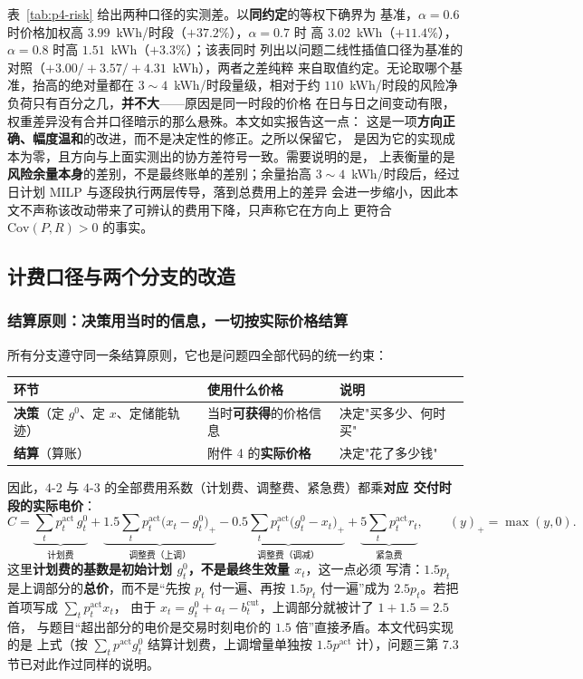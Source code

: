 表~\ref{tab:p4-risk} 给出两种口径的实测差。以\textbf{同约定}的等权下确界为
基准，$\alpha=0.6$ 时价格加权高 $3.99$~kWh/时段（$+37.2\%$），$\alpha=0.7$ 时
高 $3.02$~kWh（$+11.4\%$），$\alpha=0.8$ 时高 $1.51$~kWh（$+3.3\%$）；该表同时
列出以问题二线性插值口径为基准的对照（$+3.00/+3.57/+4.31$~kWh），两者之差纯粹
来自取值约定。无论取哪个基准，抬高的绝对量都在 $3\sim4$~kWh/时段量级，相对于约
$110$~kWh/时段的风险净负荷只有百分之几，\textbf{并不大}——原因是同一时段的价格
在日与日之间变动有限，权重差异没有合并口径暗示的那么悬殊。本文如实报告这一点：
这是一项\textbf{方向正确、幅度温和}的改进，而不是决定性的修正。之所以保留它，
是因为它的实现成本为零，且方向与上面实测出的协方差符号一致。需要说明的是，
上表衡量的是\textbf{风险余量本身}的差别，不是最终账单的差别；余量抬高
$3\sim4$~kWh/时段后，经过日计划 MILP 与逐段执行两层传导，落到总费用上的差异
会进一步缩小，因此本文不声称该改动带来了可辨认的费用下降，只声称它在方向上
更符合 $\mathrm{Cov}(P,R)>0$ 的事实。

\subsection{计费口径与两个分支的改造}
\label{sec:p4-model}

\subsubsection{结算原则：决策用当时的信息，一切按实际价格结算}

所有分支遵守同一条结算原则，它也是问题四全部代码的统一约束：

\begin{center}
\footnotesize
\begin{tabular}{lll}
  \toprule
  环节 & 使用什么价格 & 说明 \\
  \midrule
  \textbf{决策}（定 $g^0$、定 $x$、定储能轨迹）
    & 当时\textbf{可获得}的价格信息 & 决定"买多少、何时买" \\
  \textbf{结算}（算账）
    & 附件 4 的\textbf{实际价格} & 决定"花了多少钱" \\
  \bottomrule
\end{tabular}
\end{center}

因此，$4$-2 与 $4$-3 的全部费用系数（计划费、调整费、紧急费）都乘\textbf{对应
交付时段的实际电价}：
$$
C=\underbrace{\sum_t p_t^{\mathrm{act}}\,g^0_t}_{\text{计划费}}
+\underbrace{1.5\sum_t p_t^{\mathrm{act}}\big(x_t-g^0_t\big)_+}_{\text{调整费（上调）}}
-\underbrace{0.5\sum_t p_t^{\mathrm{act}}\big(g^0_t-x_t\big)_+}_{\text{调整费（调减）}}
+\underbrace{5\sum_t p_t^{\mathrm{act}}r_t}_{\text{紧急费}} ,
\qquad (y)_+=\max(y,0).
$$
这里\textbf{计划费的基数是初始计划 $g^0_t$，不是最终生效量 $x_t$}，这一点必须
写清：$1.5p_t$ 是上调部分的\textbf{总价}，而不是“先按 $p_t$ 付一遍、再按
$1.5p_t$ 付一遍”成为 $2.5p_t$。若把首项写成 $\sum_t p_t^{\mathrm{act}}x_t$，
由于 $x_t=g^0_t+a_t-b^{\mathrm{cut}}_t$，上调部分就被计了 $1+1.5=2.5$ 倍，
与题目“超出部分的电价是交易时刻电价的 $1.5$ 倍”直接矛盾。本文代码实现的是
上式（按 $\sum_t p^{\mathrm{act}}g^0_t$ 结算计划费，上调增量单独按
$1.5p^{\mathrm{act}}$ 计），问题三第 7.3 节已对此作过同样的说明。

